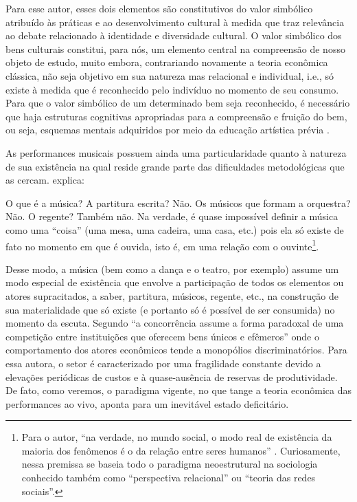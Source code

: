 \documentclass[a4paper, 12pt, openright, oneside, german, french, english, brazil]{abntex2}
\begin{document}
	Para esse autor, esses dois elementos são constitutivos do valor simbólico atribuído às práticas e ao desenvolvimento cultural à medida que traz relevância ao debate relacionado à identidade e diversidade cultural. O valor simbólico dos bens culturais constitui, para nós, um elemento central na compreensão de nosso objeto de estudo, muito embora, contrariando novamente a teoria econômica clássica, não seja objetivo em sua natureza mas relacional e individual, i.e., só existe à medida que é reconhecido pelo indivíduo no momento de seu consumo. Para que o valor simbólico de um determinado bem seja reconhecido, é necessário que haja estruturas cognitivas apropriadas para a compreensão e fruição do bem, ou seja, esquemas mentais adquiridos por meio da educação artística prévia \cite{bourdieu2003amor}.
	
	As performances musicais possuem ainda uma particularidade quanto à natureza de sua existência na qual reside grande parte das dificuldades metodológicas que as cercam.  explica:
	
	\begin{citacao}
		O que é a música? A partitura escrita? Não. Os músicos que formam a orquestra? Não. O regente? Também não. Na verdade, é quase impossível definir a música como uma ``coisa'' (uma mesa, uma cadeira, uma casa, etc.) pois ela só existe de fato no momento em que é ouvida, isto é, em uma relação com o ouvinte\footnote{Para o autor, ``na verdade, no mundo social, o modo real de existência da maioria dos fenômenos é o da relação entre seres humanos'' \cite[p. 110]{tolila2007cultura}. Curiosamente, nessa premissa se baseia todo o paradigma neoestrutural na sociologia conhecido também como ``perspectiva relacional'' ou ``teoria das redes sociais''.}. \cite[p. 109]{tolila2007cultura}
	\end{citacao}
	
	Desse modo, a música (bem como a dança e o teatro, por exemplo) assume um modo especial de existência que envolve a participação de todos os elementos ou atores supracitados, a saber, partitura, músicos, regente, etc., na construção de sua materialidade que só existe (e portanto só é possível de ser consumida) no momento da escuta. Segundo  ``a concorrência assume a forma paradoxal de uma competição entre instituições que oferecem bens únicos e efêmeros'' onde o comportamento dos atores econômicos tende a monopólios discriminatórios. Para essa autora, o setor é caracterizado por uma fragilidade constante devido a elevações periódicas de custos e à quase-ausência de reservas de produtividade. De fato, como veremos, o paradigma vigente, no que tange a teoria econômica das performances ao vivo, aponta para um inevitável estado deficitário.
	
\end{document}
